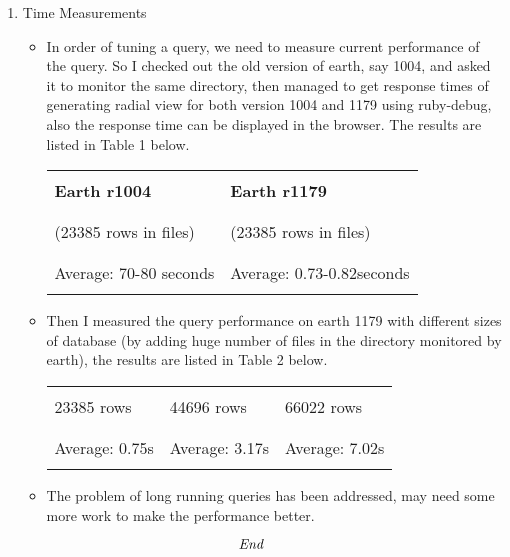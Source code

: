 \documentclass[10pt, a4]{article}
\begin{document}
\begin{enumerate}
\newpage
\item {Time Measurements}
  \begin{itemize}
  \item In order of tuning a query, we need to measure current performance of the query. So I checked out the old version of earth, say 1004, and asked it to monitor the same directory, then managed to get response times of generating radial view for both version 1004 and 1179 using ruby-debug, also the response time can be displayed in the browser. The results are listed in Table 1 below.
    \begin{table}[ht!]
      \begin{tabular}{|p{4cm}|p{4cm}|} \hline
         & \\
        \textbf{Earth r1004} & \textbf{Earth r1179}   \\
         & \\
        \hline
         & \\
        (23385 rows in files) & (23385 rows in files) \\
         & \\
        \hline
         & \\
        Average: 70-80 seconds & Average: 0.73-0.82seconds \\
         & \\
        \hline
      \end{tabular}
    \end{table}
  \item Then I measured the query performance on earth 1179 with different sizes of database (by adding huge number of files in the directory monitored by earth), the results are listed in Table 2 below.
    \begin{table}[ht!]
      \begin{tabular}{|p{3cm}|p{3cm}|p{3cm}|} \hline
         & & \\
        23385 rows & 44696 rows & 66022 rows\\
         & & \\
        \hline
         & & \\
        Average: 0.75s & Average: 3.17s & Average: 7.02s\\
         & & \\
        \hline
      \end{tabular}
    \end{table}
  \item The problem of long running queries has been addressed, may need some more work to make the performance better.
  \end{itemize}
\end{enumerate}

\[\emph{End}\]
\end{document}
